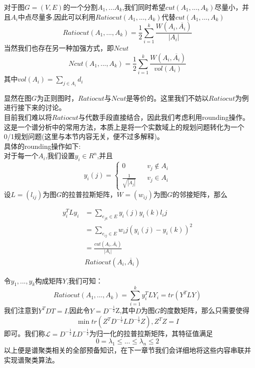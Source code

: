 \documentclass[11pt]{scrartcl}
\begin{document}
\begin{definition}[Ratiocut]
对于图$G=(V,E)$的一个分割$A_1,...A_k$,我们同时希望$cut(A_1,...,A_k)$尽量小，并且$A_i$中点尽量多,因此可以利用$Ratiocut(A_1,...,A_k)$代替$cut(A_1,...,A_k)$
$$
Ratiocut(A_1,...,A_k)=\frac{1}{2}\sum_{i=1}^k \frac{W(A_i,\overline{A_i})}{|A_i|}
$$
当然我们也存在另一种加强方式，即$Ncut$
$$
Ncut(A_1,...,A_k)=\frac{1}{2}\sum_{i=1}^k \frac{W(A_i,\overline{A_i})}{vol(A_i)}
$$
其中$vol(A_i)=\sum_{j \in A_i} d_i$
\end{definition}
显然在图$G$为正则图时，$Ratiocut$与$Ncut$是等价的。这里我们不妨以$Ratiocut$为例进行接下来的讨论。\\

目前我们难以将$Ratiocut$与代数手段直接结合，因此我们考虑利用rounding操作。这是一个谱分析中的常用方法，本质上是将一个实数域上的规划问题转化为一个0/1规划问题(这里与本节内容无关，便不过多解释)。\\
具体的rounding操作如下:\\
对于每一个$A_i$,我们设置$y_i\in R^n$,并且
$$
y_i(j)=\left\{
\begin{aligned}
0&&v_j \not \in A_i \\
\frac{1}{\sqrt{|A_j|}}&&v_j \in A_i
\end{aligned}
\right.
$$
设$L=(l_{ij})$为图$G$的拉普拉斯矩阵，$W=(w_{ij})$为图$G$的邻接矩阵，那么

\begin{equation}
\begin{aligned}
y_i^T L y_i 
&=\sum_{e_{jk}\in E} y_i(j)y_i(k)l_ij\\
&=\sum_{e_{ij}\in E} w_ij(y_i(j)-y_i(k))^2\\
&=\frac{cut(A_i,\overline{A_i})}{|A_i|}\\
&Ratiocut(A_i,\overline{A_i})
\end{aligned}
\end{equation}

令$y_1,...,y_k$构成矩阵$Y$,我们可知：
$$
Ratiocut(A_1,...,A_k)=\sum_{i=1}^k y_i^T L Y_i=tr(Y^T LY)
$$
我们注意到$Y^TDT=I$,因此令$Y=D^{-\frac{1}{2}}$Z,其中$D$为图$G$的度数矩阵，那么只需要使得
$$
\min{tr(Z^T D^{-\frac12} L D^{-\frac12} Z)},Z^TZ=I
$$
即可。我们称$\mathscr{L}=D^{-\frac12} L D^{-\frac12}$为归一化的拉普拉斯矩阵，其特征值满足
$$
0=\lambda_1\le...\le \lambda_n\le2
$$
以上便是谱聚类相关的全部预备知识，在下一章节我们会详细地将这些内容串联并实现谱聚类算法。
\end{document}
